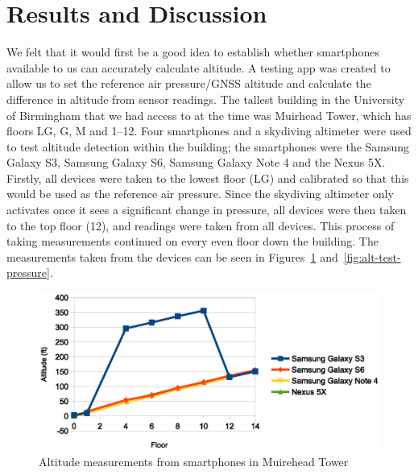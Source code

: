 \documentclass[11pt, a4paper, twocolumn]{article}
\begin{document}
\section{Results and Discussion}\label{sec:results-discussion} %

We felt that it would first be a good idea to establish whether smartphones available to us can accurately calculate altitude. A testing app was created to allow us to set the reference air pressure/GNSS altitude and calculate the difference in altitude from sensor readings.
The tallest building in the University of Birmingham that we had access to at the time was Muirhead Tower, which has floors LG, G, M and 1--12. Four smartphones and a skydiving altimeter were used to test altitude detection within the building; the smartphones were the Samsung Galaxy S3, Samsung Galaxy S6, Samsung Galaxy Note 4 and the Nexus 5X.
Firstly, all devices were taken to the lowest floor (LG) and calibrated so that this would be used as the reference air pressure. Since the skydiving altimeter only activates once it sees a significant change in pressure, all devices were then taken to the top floor (12), and readings were taken from all devices. This process of taking measurements continued on every even floor down the building.
The measurements taken from the devices can be seen in Figures~\ref{fig:alt-test-altitude} and~\ref{fig:alt-test-pressure}.

\begin{figure}[h]
    \centering
    \includegraphics{alt-test-altitude}
    \caption{Altitude measurements from smartphones in Muirehead Tower}\label{fig:alt-test-altitude}
\end{figure}
\end{document}
